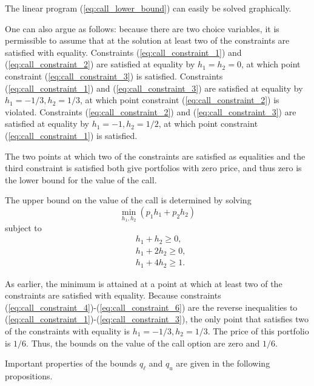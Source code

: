 \documentclass[\topdir/lecture\_notes.tex]{subfiles}
\begin{document}
\begin{optional}
\begin{example}
The linear program (\ref{eq:call_lower_bound}) can easily be solved graphically.

One can also argue as follows: because there are two choice variables, it is permissible to assume that at the solution at least two of the constraints are satisfied with equality. Constraints (\ref{eq:call_constraint_1}) and (\ref{eq:call_constraint_2}) are satisfied at equality by $h_{1}=h_{2}=0$, at which point constraint (\ref{eq:call_constraint_3}) is satisfied. Constraints (\ref{eq:call_constraint_1}) and (\ref{eq:call_constraint_3}) are satisfied at equality by $h_{1}=-1 / 3, h_{2}=1 / 3$, at which point constraint (\ref{eq:call_constraint_2}) is violated. Constraints (\ref{eq:call_constraint_2}) and (\ref{eq:call_constraint_3}) are satisfied at equality by $h_{1}=-1, h_{2}=1 / 2$, at which point constraint (\ref{eq:call_constraint_1}) is satisfied.

The two points at which two of the constraints are satisfied as equalities and the third constraint is satisfied both give portfolios with zero price, and thus zero is the lower bound for the value of the call.

The upper bound on the value of the call is determined by solving
\begin{equation*}
\min _{h_{1}, h_{2}}\left(p_{1} h_{1}+p_{2} h_{2}\right) 
\end{equation*}
subject to
\begin{align}
& h_{1}+h_{2} \geq 0, \label{eq:call_constraint_4}\\
& h_{1}+2 h_{2} \geq 0, \label{eq:call_constraint_5}\\
& h_{1}+4 h_{2} \geq 1 . \label{eq:call_constraint_6}
\end{align}

As earlier, the minimum is attained at a point at which at least two of the constraints are satisfied with equality. Because constraints (\ref{eq:call_constraint_4})-(\ref{eq:call_constraint_6}) are the reverse inequalities to (\ref{eq:call_constraint_1})-(\ref{eq:call_constraint_3}), the only point that satisfies two of the constraints with equality is $h_{1}=-1 / 3, h_{2}=1 / 3$. The price of this portfolio is $1 / 6$. Thus, the bounds on the value of the call option are zero and $1 / 6$.
\end{example}
Important properties of the bounds $q_{\ell}$ and $q_{u}$ are given in the following propositions.


\end{optional}
\end{document}
